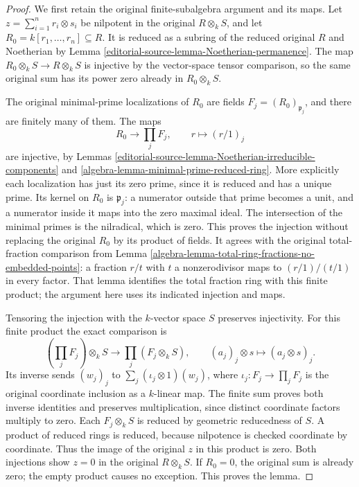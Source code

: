 \begin{proof}
We first retain the original finite-subalgebra
argument and its maps. Let
$z=\sum_{i=1}^n r_i\otimes s_i$ be nilpotent
in the original $R\otimes_kS$, and let
$R_0=k[r_1,\ldots,r_n]\subseteq R$.
It is reduced as a subring of the reduced
original $R$ and Noetherian by
Lemma \ref{editorial-source-lemma-Noetherian-permanence}.
The map $R_0\otimes_kS\to R\otimes_kS$ is
injective by the vector-space tensor comparison,
so the same original sum has its power zero
already in $R_0\otimes_kS$.

The original minimal-prime localizations of
$R_0$ are fields $F_j=(R_0)_{\mathfrak p_j}$,
and there are finitely many of them. The maps
$$
R_0\longrightarrow\prod_j F_j,\qquad
r\longmapsto(r/1)_j
$$
are injective, by
Lemmas \ref{editorial-source-lemma-Noetherian-irreducible-components}
and \ref{algebra-lemma-minimal-prime-reduced-ring}.
More explicitly each localization has just its
zero prime, since it is reduced and has a
unique prime. Its kernel on $R_0$ is
$\mathfrak p_j$: a numerator outside that
prime becomes a unit, and a numerator inside
it maps into the zero maximal ideal. The
intersection of the minimal primes is the
nilradical, which is zero. This proves the
injection without replacing the original
$R_0$ by its product of fields.
It agrees with the original total-fraction
comparison from
Lemma \ref{algebra-lemma-total-ring-fractions-no-embedded-points}:
a fraction $r/t$ with $t$ a nonzerodivisor
maps to $(r/1)/(t/1)$ in every factor.
That lemma identifies the total fraction ring
with this finite product; the argument here
uses its indicated injection and maps.

Tensoring the injection with the $k$-vector
space $S$ preserves injectivity. For this
finite product the exact comparison is
$$
\left(\prod_j F_j\right)\otimes_kS
\longrightarrow\prod_j(F_j\otimes_kS),\qquad
(a_j)_j\otimes s\longmapsto(a_j\otimes s)_j.
$$
Its inverse sends $(w_j)_j$ to
$\sum_j(\iota_j\otimes1)(w_j)$, where
$\iota_j:F_j\to\prod_jF_j$ is the original
coordinate inclusion as a $k$-linear map.
The finite sum proves both inverse identities
and preserves multiplication, since distinct
coordinate factors multiply to zero.
Each $F_j\otimes_kS$ is reduced by geometric
reducedness of $S$. A product of reduced rings
is reduced, because nilpotence is checked
coordinate by coordinate. Thus the image of
the original $z$ in this product is zero.
Both injections show $z=0$ in the original
$R\otimes_kS$. If $R_0=0$, the original sum
is already zero; the empty product causes
no exception. This proves the lemma.


\end{proof}
